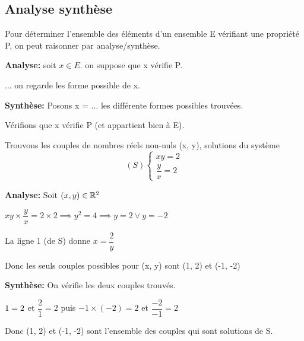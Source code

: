 \documentclass[a4paper, 12pt]{article}
\begin{document}
\subsection{Analyse synthèse}

\begin{methode}
    Pour déterminer l'ensemble des éléments d'un ensemble E vérifiant une propriété P, on peut raisonner par analyse/synthèse.

    \vspace{1em}

    \item \textbf{Analyse:} soit $x \in E$. on suppose que x vérifie P.
    \item ... on regarde les forme possible de x.
    \item \textbf{Synthèse:} Posons x = ... les différente formes possibles trouvées.
    \item Vérifions que x vérifie P (et appartient bien à E).
\end{methode}

\begin{example}
    Trouvons les couples de nombres réels non-nuls (x, y), solutions du système
    \begin{equation*}
        (S)
        \begin{cases}
            xy = 2\\
            \dfrac{y}{x} = 2
        \end{cases}
    \end{equation*}

    \begin{demonstration*}
        \textbf{Analyse:} Soit $(x, y) \in \mathbb{R}^2$

        $xy \times \dfrac{y}{x} = 2 \times 2 \implies y^2 = 4 \implies y = 2 \lor y = -2$

        La ligne 1 (de S) donne $x = \dfrac{2}{y}$

        Donc les seuls couples possibles pour (x, y) sont (1, 2) et (-1, -2)

        \vspace{0.5em}

        \textbf{Synthèse:} On vérifie les deux couples trouvés.

        $1 \time 2 = 2$ et $\dfrac{2}{1} = 2$
        puis $-1 \times (-2) = 2$ et $\dfrac{-2}{-1} = 2$

        \begin{rdem}
            Donc (1, 2) et (-1, -2) sont l'ensemble des couples qui sont solutions de S.
        \end{rdem}
    \end{demonstration*}
\end{example}
\end{document}
